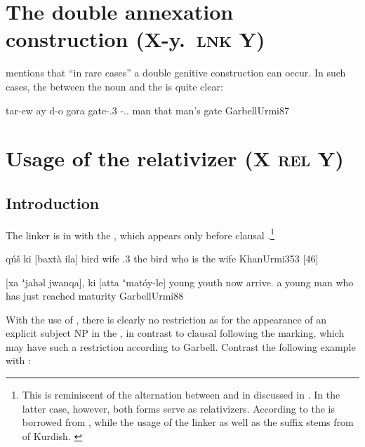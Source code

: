 \largerpage
\section{The double annexation construction (X-y.\poss\ \textsc{lnk} Y)} \label{ss:JUrm_double}

\citet[87]{GarbellUrmi} mentions that  \enquote{in rare cases} a double genitive construction can occur. In such cases, the  between the \prim noun and the \lnk* is quite clear: 

{tar-ew ay d-o gora}
{gate-\poss.3\masc{} \lnk{} \gen-\dem.\far.\masc{} man}
{that man's gate}
{GarbellUrmi}{87}





\section{Usage of the relativizer (X \textsc{rel} Y)} \label{ss:JUrm_Rel}

\subsection{Introduction}

The linker  is in  with  the  , which appears only before clausal \secns.\footnote{This  is reminiscent of the alternation between  and  in \JSan discussed in . In the latter case, however, both forms serve as relativizers. According to \citet[171--172]{Garbell1965impact} the  is borrowed from  , while the usage of the linker as well as the \cst* suffix stems from  of Kurdish. \label{ft:JUrm_rel_influence}}

{qúš ki\cb{} [baxtà \cb{}ila]}
{bird \rel\cb{} \hphantom{[}wife \cb{}\cop.3\fem}
{the bird who is the wife}
{KhanUrmi}{353 {[46]}}

{[xa ⁺jahəl jwanqa], ki [atta ⁺matóy-le]}
{\indef{} young youth \rel{} now arrive.\masc}
{a young man who has just reached maturity}
{GarbellUrmi}{88}

With the use of , there is clearly no restriction as for the appearance of an explicit subject NP in the , in contrast to clausal \secns following the \cst* marking, which may have such a restriction according to Garbell. Contrast the following example with :

